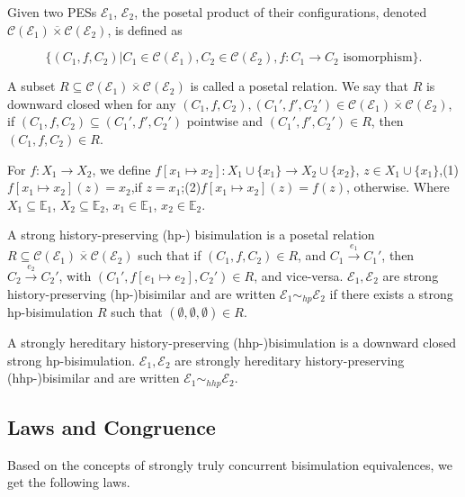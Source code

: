 \begin{definition}
Given two PESs $\mathcal{E}_1$, $\mathcal{E}_2$, the posetal product of their configurations, denoted $\mathcal{C}(\mathcal{E}_1)\overline{\times}\mathcal{C}(\mathcal{E}_2)$, is defined as

$$\{(C_1,f,C_2)|C_1\in\mathcal{C}(\mathcal{E}_1),C_2\in\mathcal{C}(\mathcal{E}_2),f:C_1\rightarrow C_2 \textrm{ isomorphism}\}.$$

A subset $R\subseteq\mathcal{C}(\mathcal{E}_1)\overline{\times}\mathcal{C}(\mathcal{E}_2)$ is called a posetal relation. We say that $R$ is downward closed when for any $(C_1,f,C_2),(C_1',f',C_2')\in \mathcal{C}(\mathcal{E}_1)\overline{\times}\mathcal{C}(\mathcal{E}_2)$, if $(C_1,f,C_2)\subseteq (C_1',f',C_2')$ pointwise and $(C_1',f',C_2')\in R$, then $(C_1,f,C_2)\in R$.


For $f:X_1\rightarrow X_2$, we define $f[x_1\mapsto x_2]:X_1\cup\{x_1\}\rightarrow X_2\cup\{x_2\}$, $z\in X_1\cup\{x_1\}$,(1)$f[x_1\mapsto x_2](z)=
x_2$,if $z=x_1$;(2)$f[x_1\mapsto x_2](z)=f(z)$, otherwise. Where $X_1\subseteq \mathbb{E}_1$, $X_2\subseteq \mathbb{E}_2$, $x_1\in \mathbb{E}_1$, $x_2\in \mathbb{E}_2$.
\end{definition}

\begin{definition}\label{HHPB}
A strong history-preserving (hp-) bisimulation is a posetal relation $R\subseteq\mathcal{C}(\mathcal{E}_1)\overline{\times}\mathcal{C}(\mathcal{E}_2)$ such that if $(C_1,f,C_2)\in R$, and $C_1\xrightarrow{e_1} C_1'$, then $C_2\xrightarrow{e_2} C_2'$, with $(C_1',f[e_1\mapsto e_2],C_2')\in R$, and vice-versa. $\mathcal{E}_1,\mathcal{E}_2$ are strong history-preserving (hp-)bisimilar and are written $\mathcal{E}_1\sim_{hp}\mathcal{E}_2$ if there exists a strong hp-bisimulation $R$ such that $(\emptyset,\emptyset,\emptyset)\in R$.

A strongly hereditary history-preserving (hhp-)bisimulation is a downward closed strong hp-bisimulation. $\mathcal{E}_1,\mathcal{E}_2$ are strongly hereditary history-preserving (hhp-)bisimilar and are written $\mathcal{E}_1\sim_{hhp}\mathcal{E}_2$.
\end{definition}

\subsection{Laws and Congruence}

Based on the concepts of strongly truly concurrent bisimulation equivalences, we get the following laws.

